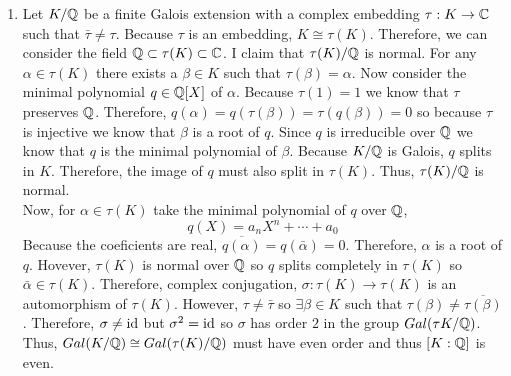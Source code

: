 \documentclass[12pt]{extarticle}
\begin{document}
\begin{enumerate}
\item Let $K/\mathbb{Q}$ be a finite Galois extension with a complex embedding $\tau : K \to \mathbb{C}$ such that $\bar{\tau} \neq \tau$. Because $\tau$ is an embedding, $K \cong \tau(K)$. Therefore, we can consider the field $\mathbb{Q} \subset \tau(K) \subset \mathbb{C}$. I claim that $\tau(K)/ \mathbb{Q}$ is normal. For any $\alpha \in \tau(K)$ there exists a $\beta \in K$ such that $\tau(\beta) = \alpha$. Now consider the minimal polynomial $q \in \mathbb{Q}[X]$ of $\alpha$. Because $\tau(1) = 1$ we know that $\tau$ preserves $\mathbb{Q}$. Therefore, $q(\alpha) = q(\tau(\beta)) = \tau(q(\beta)) = 0$ so because $\tau$ is injective we know that $\beta$ is a root of $q$. Since $q$ is irreducible over $\mathbb{Q}$ we know that $q$ is the minimal polynomial of $\beta$. Because $K/\mathbb{Q}$ is Galois, $q$ splits in $K$. Therefore, the image of $q$ must also split in $\tau(K)$. Thus, $\tau(K) / \mathbb{Q}$ is normal. \bigskip \\
Now, for $\alpha \in \tau(K)$ take the minimal polynomial of $q$ over $\mathbb{Q}$,
\[ q(X) = a_n X^n + \cdots + a_0 \]
Because the coeficients are real, $\overline{q(\alpha)} = q(\bar{\alpha}) = 0$. Therefore, $\alpha$ is a root of $q$. Hovever, $\tau(K)$ is normal over $\mathbb{Q}$ so $q$ splits completely in $\tau(K)$ so $\bar{\alpha} \in \tau(K)$. Therefore, complex conjugation, $\sigma : \tau(K) \to \tau(K)$ is an automorphism of $\tau(K)$. However, $\tau \neq \bar{\tau}$ so $\exists \beta \in K$ such that $\tau(\beta) \neq \overline{\tau(\beta)}$. Therefore, $\sigma \neq \mathrm{id}$ but $\sigma^2 = \mathrm{id}$ so $\sigma$ has order $2$ in the group $Gal \small(\tau{K}/\mathbb{Q} \small)$. Thus, $Gal \small(K/\mathbb{Q} \small) \cong Gal \small(\tau(K)/ \mathbb{Q} \small)$ must have even order and thus $[K : \mathbb{Q}]$ is even.  


\end{enumerate}
\end{document}
